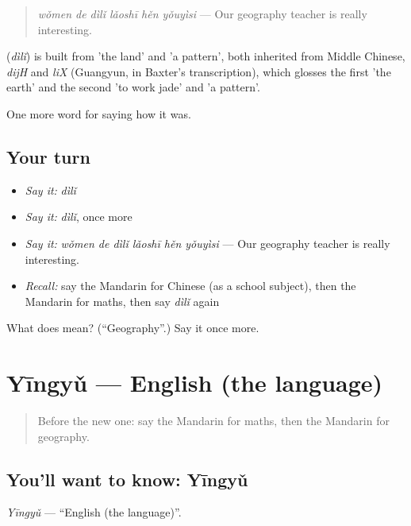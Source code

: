 \begin{quote}
\emph{wǒmen de dìlǐ lǎoshī hěn yǒuyìsi} — Our geography teacher is really interesting.
\end{quote}

\begin{cousinweb}
\textbf{} (\emph{dìlǐ}) is built from  'the land' and  'a pattern', both inherited from Middle Chinese, \emph{dijH} and \emph{liX} (Guangyun, in Baxter's transcription), which glosses the first 'the earth' and the second 'to work jade' and 'a pattern'.
\end{cousinweb}

\begin{grammarlens}[title={What you've built}]
One more word for saying how it was.
\end{grammarlens}

\subsection*{Your turn}
\begin{itemize}
\raggedright
  \item \emph{Say it:} \emph{dìlǐ}
  \item \emph{Say it:} \emph{dìlǐ}, once more
  \item \emph{Say it:} \emph{wǒmen de dìlǐ lǎoshī hěn yǒuyìsi} — Our geography teacher is really interesting.
  \item \emph{Recall:} say the Mandarin for Chinese (as a school subject), then the Mandarin for maths, then say \emph{dìlǐ} again
\end{itemize}

\begin{tcolorbox}[breakable,colback=teal!4,colframe=teal!35!black,title={Before you move on}]
What does  mean? (\textquotedblleft{}Geography\textquotedblright{}.) Say it once more.
\end{tcolorbox}
\section[Yīngyǔ]{Yīngyǔ — English (the language)}

\label{lesson:ZH-C492-yingyu}



\begin{quote}
Before the new one: say the Mandarin for maths, then the Mandarin for geography.
\end{quote}

\subsection*{You'll want to know: Yīngyǔ}
\emph{Yīngyǔ} — \textquotedblleft{}English (the language)\textquotedblright{}.

